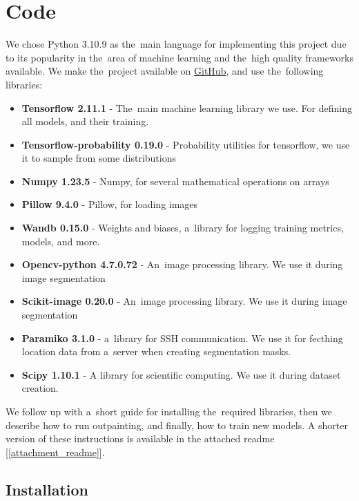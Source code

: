 \chapter{Code} \label{code}

We chose Python 3.10.9 as the~main language for implementing this project due to its popularity in the~area of machine learning and the~high quality frameworks available. We make the~project available on \textcolor{red}{\href{https://github.com/Matezzzz/Image_outpainting}{GitHub}}, and use the~following libraries:

\begin{itemize}
    \item \textbf{Tensorflow 2.11.1} \citep{tensorflow} - The~main machine learning library we use. For defining all models, and their training.
    \item \textbf{Tensorflow-probability 0.19.0} \citep{tensorflow_probability} - Probability utilities for tensorflow, we use it to sample from some distributions
    \item \textbf{Numpy 1.23.5} \citep{numpy} - Numpy, for several mathematical operations on arrays
    \item \textbf{Pillow 9.4.0} \citep{pillow} - Pillow, for loading images
    \item \textbf{Wandb 0.15.0} \citep{wandb} - Weights and biases, a~library for logging training metrics, models, and more.
    \item \textbf{Opencv-python 4.7.0.72} \citep{opencv_python} - An~image processing library. We use it during image segmentation
    \item \textbf{Scikit-image 0.20.0} \citep{scikit_image} - An~image processing library. We use it during image segmentation
    \item \textbf{Paramiko 3.1.0} \citep{paramiko} - a~library for SSH communication. We use it for fecthing location data from a~server when creating segmentation masks.
    \item \textbf{Scipy 1.10.1} \citep{scipy} - A library for scientific computing. We use it during dataset creation.
\end{itemize}


We follow up with a~short guide for installing the~required libraries, then we describe how to run outpainting, and finally, how to train new models. A shorter version of these instructions is available in the attached readme [\ref{attachment_readme}].

\section{Installation}

